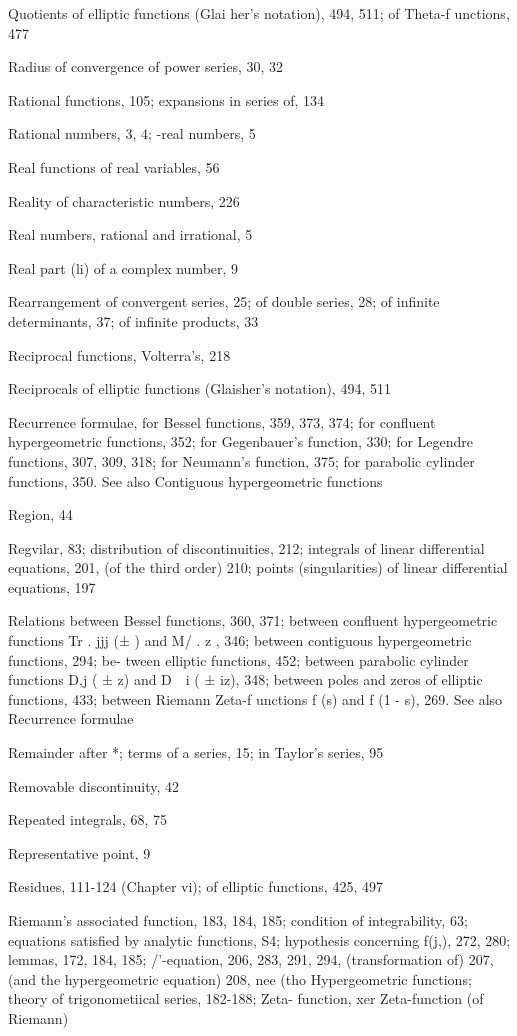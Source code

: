 Quotients of elliptic functions (Glai her's notation), 494, 511; of Theta-f unctions, 477

Radius of convergence of power series, 30, 32

Rational functions, 105; expansions in series of, 134

Rational numbers, 3, 4; -real numbers, 5

Real functions of real variables, 56

Reality of characteristic numbers, 226

Real numbers, rational and irrational, 5

Real part (li) of a complex number, 9

Rearrangement of convergent series, 25; of double series, 28; of infinite determinants, 37; of
infinite products, 33

Reciprocal functions, Volterra's, 218

Reciprocals of elliptic functions (Glaisher's notation), 494, 511

Recurrence formulae, for Bessel functions, 359, 373, 374; for confluent hypergeometric functions,
352; for Gegenbauer's function, 330; for Legendre functions, 307, 309, 318; for Neumann's
function, 375; for parabolic cylinder functions, 350. See also Contiguous hypergeometric
functions

Region, 44

Regvilar, 83; distribution of discontinuities, 212; integrals of linear differential equations, 201,
(of the third order) 210; points (singularities) of linear differential equations, 197

Relations between Bessel functions, 360, 371; between confluent hypergeometric functions
Tr\; . jjj (± ) and M/ .    z , 346; between contiguous hypergeometric functions, 294; be-
tween elliptic functions, 452; between parabolic cylinder functions D,j ( ± z) and D\  \ i ( ± iz),
348; between poles and zeros of elliptic functions, 433; between Riemann Zeta-f unctions
f (s) and f (1 - s), 269. See also Recurrence formulae

Remainder after *; terms of a series, 15; in Taylor's series, 95

Removable discontinuity, 42

Repeated integrals, 68, 75

Representative point, 9

Residues, 111-124 (Chapter vi); of elliptic functions,
425, 497

%
%
Riemann's associated function, 183, 184, 185; condition of integrability, 63; equations satisfied
by analytic functions, S4; hypothesis concerning f(j,), 272, 280; lemmas, 172, 184, 185;
/'-equation, 206, 283, 291, 294, (transformation of) 207, (and the hypergeometric equation)
208, nee (tho Hypergeometric functions; theory of trigonometiical series, 182-188; Zeta-
function, xer Zeta-function (of Riemann)

